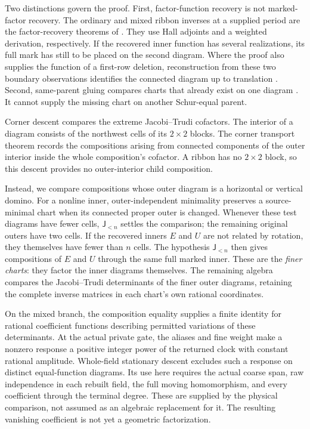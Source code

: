 \documentclass[11pt,a4paper]{amsart}
\numberwithin{equation}{section}
\theoremstyle{plain}
\theoremstyle{definition}
\newcommand{\Jlower}{\mathsf J_{<n}}
\begin{document}
Two distinctions govern the proof.  First, factor-function recovery is not
marked-factor recovery.  The ordinary and mixed ribbon inverses at a
supplied period are the factor-recovery theorems of
\cite{Shields2026Readout}.  They use Hall adjoints and a weighted derivation, respectively.
If the recovered inner function has several realizations, its full mark
has still to be placed on the second diagram.  Where the proof also
supplies the function of a first-row deletion, reconstruction from these
two boundary observations identifies the connected diagram up to
translation \cite[Reconstruction from two boundary observations]{Shields2026SkewSchur}.
Second, same-parent gluing
compares charts that already exist on one diagram
\cite{Shields2026Gluing}.  It cannot supply the missing chart on another
Schur-equal parent.

Corner descent compares the extreme Jacobi--Trudi cofactors.  The interior
of a diagram consists of the northwest cells of its \(2\times2\) blocks.
The corner transport theorem \cite{Shields2026CornerDescent} records the
compositions arising from connected components of the outer interior
inside the whole composition's cofactor.  A ribbon has no \(2\times2\)
block, so this descent provides no outer-interior child composition.

Instead, we compare compositions whose outer diagram is a horizontal or
vertical domino.  For a nonline inner, outer-independent minimality
\cite{Shields2026CornerDescent} preserves a source-minimal chart when its
connected proper outer is changed.  Whenever these test diagrams have fewer cells,
\(\Jlower\) settles the comparison; the remaining original outers have
two cells.  If the recovered inners \(E\) and \(U\) are not related by
rotation, they themselves have fewer than \(n\) cells.
The hypothesis \(\Jlower\) then gives compositions of \(E\) and \(U\)
through the same full marked inner.  These are the \emph{finer charts}:
they factor the inner diagrams themselves.
The remaining algebra compares the Jacobi--Trudi determinants of the finer
outer diagrams, retaining the complete inverse matrices in each chart's
own rational coordinates.

On the mixed branch, the composition equality supplies a finite identity
for rational coefficient functions describing permitted variations of
these determinants.  At the actual private gate, the aliases and fine
weight make a nonzero response a positive integer power of the returned
clock with constant rational amplitude.  Whole-field stationary descent
\cite[Whole moving potential]{Shields2026Coframes} excludes such a response
on distinct equal-function diagrams.  Its use here requires the actual
coarse span, raw independence in each rebuilt field, the full moving
homomorphism, and every coefficient through the terminal degree.
These are supplied by the physical comparison, not assumed as an
algebraic replacement for it.  The resulting vanishing coefficient is
not yet a geometric factorization.
\end{document}
